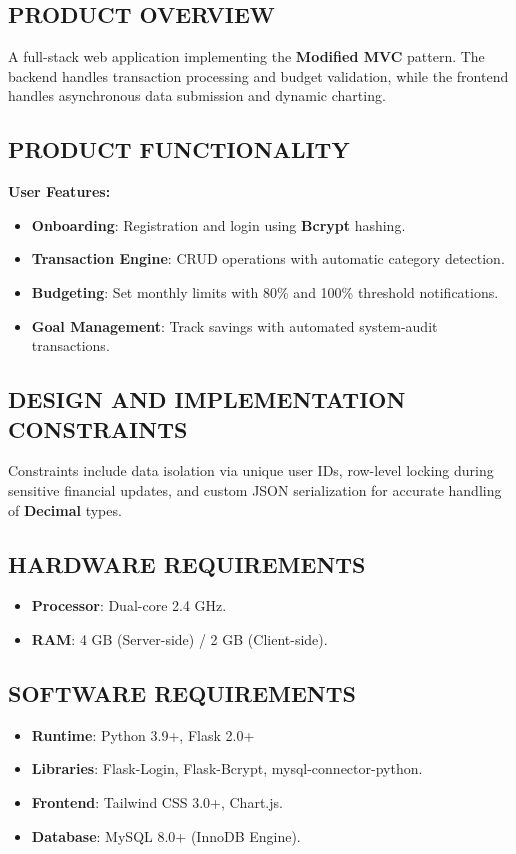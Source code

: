 \documentclass[12pt,a4paper]{article}
\begin{document}
\subsection{PRODUCT OVERVIEW}
A full-stack web application implementing the \textbf{Modified MVC} pattern. The backend handles transaction processing and budget validation, while the frontend handles asynchronous data submission and dynamic charting.

\subsection{PRODUCT FUNCTIONALITY}
\textbf{User Features:}
\begin{itemize}
    \item \textbf{Onboarding}: Registration and login using \textbf{Bcrypt} hashing.
    \item \textbf{Transaction Engine}: CRUD operations with automatic category detection.
    \item \textbf{Budgeting}: Set monthly limits with 80\% and 100\% threshold notifications.
    \item \textbf{Goal Management}: Track savings with automated system-audit transactions.
\end{itemize}

\subsection{DESIGN AND IMPLEMENTATION CONSTRAINTS}
Constraints include data isolation via unique user IDs, row-level locking during sensitive financial updates, and custom JSON serialization for accurate handling of \textbf{Decimal} types.

\subsection{HARDWARE REQUIREMENTS}
\begin{itemize}
    \item \textbf{Processor}: Dual-core 2.4 GHz.
    \item \textbf{RAM}: 4 GB (Server-side) / 2 GB (Client-side).
\end{itemize}

\subsection{SOFTWARE REQUIREMENTS}
\begin{itemize}
    \item \textbf{Runtime}: Python 3.9+, Flask 2.0+
    \item \textbf{Libraries}: Flask-Login, Flask-Bcrypt, mysql-connector-python.
    \item \textbf{Frontend}: Tailwind CSS 3.0+, Chart.js.
    \item \textbf{Database}: MySQL 8.0+ (InnoDB Engine).
\end{itemize}
\end{document}
